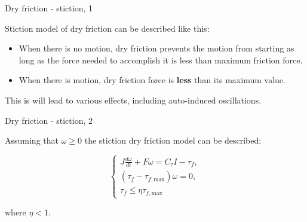 \documentclass{beamer}
\begin{document}
\begin{frame}{Dry friction - stiction, 1}
	\begin{flushleft}
		
		Stiction model of dry friction can be described like this:
		
		\begin{itemize}
			\item When there is no motion, dry friction prevents the motion from starting as long as the force needed to accomplish it is less than maximum friction force.
			
			\item When there is motion, dry friction force is \textbf{less} than its maximum value.
		\end{itemize}  
		
		This is will lead to various effects, including auto-induced oscillations.
		
	\end{flushleft}
\end{frame}


\begin{frame}{Dry friction - stiction, 2}
	\begin{flushleft}
		
		Assuming that $\omega 
		\geq 0$ the stiction dry friction model can be described:
		
		\begin{equation}
			\begin{cases}
				J \frac{d \omega}{dt} + F \omega = C_\tau I - \tau_f,  \\
				(\tau_f -  \tau_{f, \text{max}}) \omega = 0, \\
				\tau_f \leq \eta \tau_{f, \text{max}}
			\end{cases}
		\end{equation}
		
		where $\eta < 1$.
		
	\end{flushleft}
\end{frame}
\end{document}
